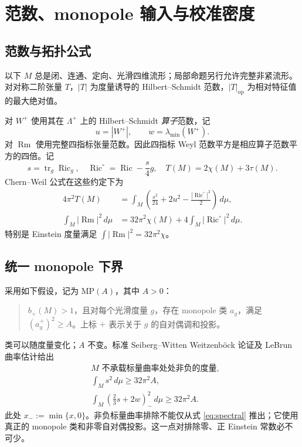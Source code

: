 \documentclass[UTF8,fontset=fandol,zihao=-4]{ctexart}
\theoremstyle{cn}
\DeclareMathOperator{\Ric}{Ric}
\DeclareMathOperator{\Rm}{Rm}
\DeclareMathOperator{\tr}{tr}
\newcommand{\op}{\mathrm{op}}
\newcommand{\dd}{\,d\mu}
\numberwithin{equation}{section}
\begin{document}
\section{范数、monopole 输入与校准密度}

\subsection{范数与拓扑公式}

以下 $M$ 总是闭、连通、定向、光滑四维流形；局部命题另行允许完整非紧流形。对对称二阶张量 $T$，$|T|$ 为度量诱导的 Hilbert--Schmidt 范数，$|T|_{\op}$ 为相对特征值的最大绝对值。

对 $W^+$ 使用其在 $\Lambda^+$ 上的 Hilbert--Schmidt \emph{算子}范数，记
\[
u=|W^+|,\qquad w=\lambda_{\min}(W^+).
\]
对 $\Rm$ 使用完整四指标张量范数。因此四指标 Weyl 范数平方是相应算子范数平方的四倍。记
\[
s=\tr_g\Ric_g,\quad \Ric^\circ=\Ric-\frac{s}{4}g,\quad
T(M)=2\chi(M)+3\tau(M).
\]
Chern--Weil 公式在这些约定下为
\begin{align}
4\pi^2T(M)&=\int_M\left(\frac{s^2}{24}+2u^2-\frac{|\Ric^\circ|^2}{2}\right)\dd,\label{eq:cw}\\
\int_M|\Rm|^2\dd&=32\pi^2\chi(M)+4\int_M|\Ric^\circ|^2\dd.\label{eq:fullrm}
\end{align}
特别是 Einstein 度量满足 $\int|\Rm|^2=32\pi^2\chi$。

\subsection{统一 monopole 下界}

采用如下假设，记为 $\mathrm{MP}(A)$，其中 $A>0$：
\begin{quote}
$b_+(M)>1$，且对每个光滑度量 $g$，存在 monopole 类 $a_g$，满足 $(a_g^+)^2\ge A$。上标 $+$ 表示关于 $g$ 的自对偶调和投影。
\end{quote}
类可以随度量变化；$A$ 不变。标准 Seiberg--Witten Weitzenböck 论证及 LeBrun 曲率估计给出\cite{lebrun2001,lebrun2004}
\begin{align}
&M\text{ 不承载标量曲率处处非负的度量},\label{eq:no-psc}\\
&\int_Ms^2\dd\ge32\pi^2A,\label{eq:scalar}\\
&\int_M\left(\frac23s+2w\right)_{-}^{\!2}\dd\ge32\pi^2A.\label{eq:spectral}
\end{align}
此处 $x_-:=\min\{x,0\}$。非负标量曲率排除不能仅从式 \eqref{eq:spectral} 推出；它使用真正的 monopole 类和非零自对偶投影。这一点对排除零、正 Einstein 常数必不可少。
\end{document}

